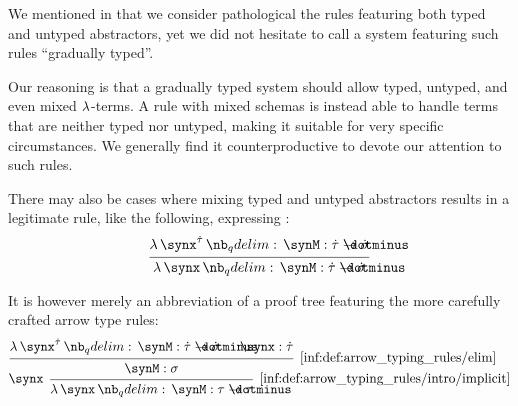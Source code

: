 \begin{remark}\label{rem:mixed_terms_and_typing_style}
  We mentioned in  that we consider pathological the rules featuring both typed and untyped abstractors, yet we did not hesitate to call a system featuring such rules \enquote{gradually typed}.

  Our reasoning is that a gradually typed system should allow typed, untyped, and even mixed \( \mathrm{\lambda} \)-terms. A rule with mixed schemas is instead able to  handle terms that are neither typed nor untyped, making it suitable for very specific circumstances. We generally find it counterproductive to devote our attention to such rules.

  There may also be cases where mixing typed and untyped abstractors results in a legitimate rule, like the following, expressing :
  \begin{equation*}
    \begin{prooftree}
      \hypo{ \qabs {\synx^{\syn\tau}} \synM: \syn\tau \synimplies \syn\sigma }
      \infer1{ \qabs \synx \synM: \syn\tau \synimplies \syn\sigma }
    \end{prooftree}
  \end{equation*}

  It is however merely an abbreviation of a proof tree featuring the more carefully crafted arrow type rules:
  \begin{equation*}
    \begin{prooftree}
      \hypo{ \qabs {\synx^{\syn\tau}} \synM: \syn\tau \synimplies \syn\sigma }
      \hypo{ \synx: \syn\tau }
      \infer2[\ref{inf:def:arrow_typing_rules/elim}]{ \synM: \sigma }
      \infer[left label=\( \synx \)]1[\ref{inf:def:arrow_typing_rules/intro/implicit}]{ \qabs \synx \synM: \tau \synimplies \tau }
    \end{prooftree}
  \end{equation*}
\end{remark}

